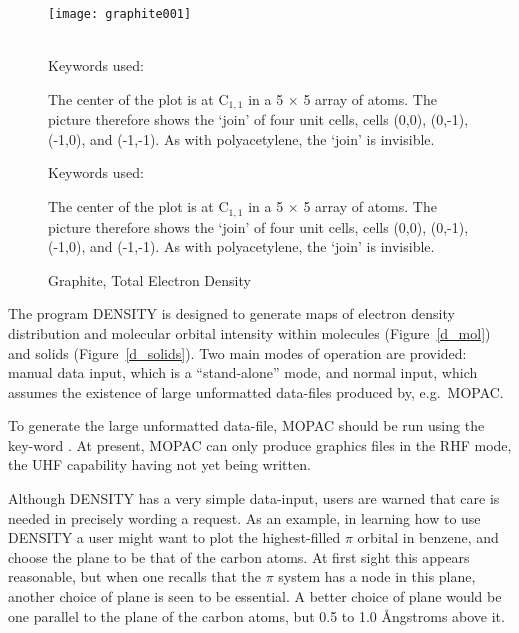 \begin{figure}
\begin{makeimage}
\end{makeimage}
\begin{center}
\texttt{[image: graphite001]} \\~\\
\begin{latexonly}
\parbox{30em}{Keywords used:


The center of the plot is at C$_{1,1}$ in a 5 $\times$ 5 array of atoms.
The picture therefore shows the `join' of four unit cells, cells (0,0),
(0,-1), (-1,0), and (-1,-1).  As with polyacetylene, the `join' is
invisible.}
\end{latexonly}
\begin{htmlonly}
Keywords used:


The center of the plot is at C$_{1,1}$ in a 5 $\times$ 5 array of atoms.
The picture therefore shows the `join' of four unit cells, cells (0,0),
(0,-1), (-1,0), and (-1,-1).  As with polyacetylene, the `join' is
invisible.
\end{htmlonly}
\end{center}
\caption{\label{d_solids2}Graphite, Total Electron Density}
\end{figure}

The program DENSITY is designed to generate  maps of electron density
distribution and molecular orbital intensity within molecules
(Figure~\ref{d_mol}) and solids (Figure~\ref{d_solids}). Two main modes of
operation are provided: manual data input, which is a ``stand-alone'' mode, and
normal input, which assumes the existence of large unformatted data-files
produced  by, e.g.\ MOPAC.

 To generate the large unformatted data-file, MOPAC
should be run using the key-word . At present, MOPAC can only
produce graphics files in the RHF mode, the UHF capability having not yet being
written.

Although DENSITY has a very simple data-input, users are warned that care is
needed in precisely wording a request. As an example, in learning how to use
DENSITY a user might want to plot the highest-filled $\pi$ orbital in benzene,
and choose the plane to be that of the carbon atoms. At first sight this
appears reasonable, but when one recalls that the $\pi$ system has a node in
this plane, another choice of plane is seen to be essential. A better choice of
plane would be one parallel to the plane of the carbon  atoms, but 0.5 to 1.0
\AA ngstroms above it.

